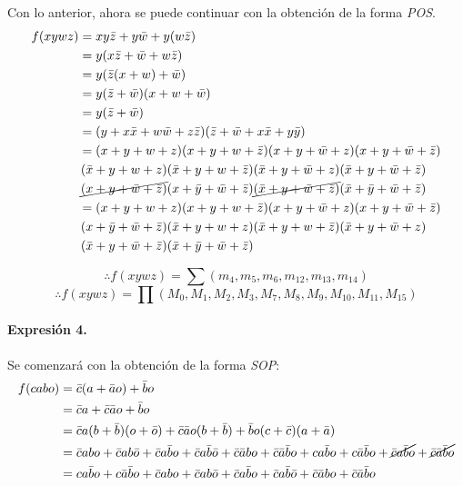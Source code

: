 \documentclass[../procedimientos.tex]{subfiles}
\begin{document}
Con lo anterior, ahora se puede continuar con la obtención de la forma 
\textit{POS}.
\begin{align*}
  f(xywz) &= x y \bar{z} + y \bar{w} + y (w \bar{z})\\
  &= y (x \bar{z} + \bar{w} + w \bar{z})\\
  &= y (\bar{z} (x + w) + \bar{w})\\
  &= y (\bar{z} + \bar{w}) (x + w + \bar{w})\\
  &= y (\bar{z} + \bar{w})\\
  &= (y + x\bar{x} + w\bar{w} + z\bar{z}) (\bar{z} + \bar{w} + x\bar{x} + y\bar{y})\\
  &= (x + y + w + z) (x + y + w + \bar{z}) (x + y + \bar{w} + z) (x + y + \bar{w} 
  + \bar{z})\\
  &\, (\bar{x} + y + w + z) (\bar{x} + y + w + \bar{z}) (\bar{x} + y + \bar{w} + z) 
  (\bar{x} + y + \bar{w} + \bar{z})\\
  &\, \cancel{(x + y + \bar{w} + \bar{z})} (x + \bar{y} + \bar{w} + \bar{z}) 
  \cancel{(\bar{x} + y + \bar{w} + \bar{z})} (\bar{x} + \bar{y} + \bar{w} + 
  \bar{z})\\
  &= (x + y + w + z) (x + y + w + \bar{z}) (x + y + \bar{w} + z) (x + y + \bar{w} 
  + \bar{z})\\
  &\, (x + \bar{y} + \bar{w} + \bar{z}) (\bar{x} + y + w + z) (\bar{x} + y + w + 
  \bar{z}) (\bar{x} + y + \bar{w} + z)\\
  &\, (\bar{x} + y + \bar{w} + \bar{z}) (\bar{x} + \bar{y} + \bar{w} + \bar{z})
\end{align*}

\begin{equation*}
  \boxed{
    \therefore f(xywz) = \sum (m_4, m_5, m_6, m_{12}, m_{13}, m_{14})
  }
\end{equation*}
\begin{equation*}
  \boxed{
    \therefore f(xywz) = \prod (M_0, M_1, M_2, M_3, M_7, M_8, M_9, M_{10}, 
  M_{11}, M_{15})
  }
\end{equation*}

\paragraph{Expresión 4.} Se comenzará con la obtención de la forma 
\textit{SOP}:
\begin{align*}
  f(cabo) &= \bar{c} (a + \bar{a}o) + \bar{b} o\\
  &= \bar{c}a + \bar{c}\bar{a}o + \bar{b} o\\
  &= \bar{c}a(b+\bar{b})(o+\bar{o}) + \bar{c}\bar{a}o(b+\bar{b}) + 
  \bar{b}o(c+\bar{c})(a+\bar{a})\\
  &= \bar{c}abo + \bar{c}ab\bar{o} + \bar{c}a\bar{b}o + \bar{c}a\bar{b}\bar{o} + 
  \bar{c}\bar{a}bo + \bar{c}\bar{a}\bar{b}o + ca\bar{b}o + c\bar{a}\bar{b}o + 
  \cancel{\bar{c}a\bar{b}o} + \cancel{\bar{c}\bar{a}\bar{b}o}\\
  &= ca\bar{b}o + c\bar{a}\bar{b}o + \bar{c}abo + \bar{c}ab\bar{o} + \bar{c}a\bar{b}o 
  + \bar{c}a\bar{b}\bar{o} + \bar{c}\bar{a}bo + \bar{c}\bar{a}\bar{b}o
\end{align*}
\end{document}

